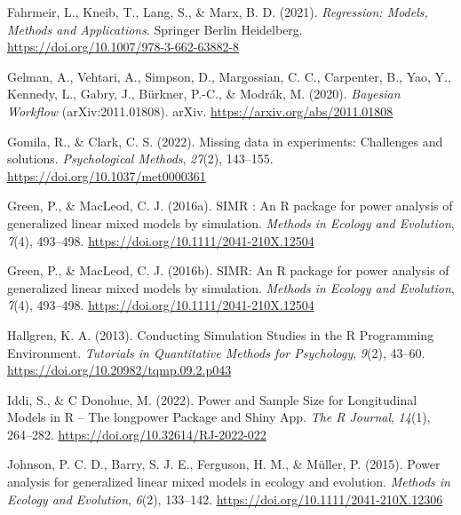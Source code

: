 \documentclass[
  man,
  floatsintext,
  longtable,
  a4paper,
  nolmodern,
  notxfonts,
  notimes,
  colorlinks=true,linkcolor=blue,citecolor=blue,urlcolor=blue]{apa7}
\newlength{\cslhangindent}
\newenvironment{CSLReferences}[2] %
 {\begin{list}{}{%
  \setlength{\itemindent}{0pt}
  \setlength{\leftmargin}{0pt}
  \setlength{\parsep}{0pt}
  \ifodd #1
   \setlength{\leftmargin}{\cslhangindent}
   \setlength{\itemindent}{-1\cslhangindent}
  \fi
  \setlength{\itemsep}{#2\baselineskip}}}
 {\end{list}}
\begin{document}
\begin{CSLReferences}{1}{0}
Fahrmeir, L., Kneib, T., Lang, S., \& Marx, B. D. (2021).
\emph{Regression: {Models}, {Methods} and {Applications}}. Springer
Berlin Heidelberg. \url{https://doi.org/10.1007/978-3-662-63882-8}

Gelman, A., Vehtari, A., Simpson, D., Margossian, C. C., Carpenter, B.,
Yao, Y., Kennedy, L., Gabry, J., Bürkner, P.-C., \& Modrák, M. (2020).
\emph{Bayesian {Workflow}} (arXiv:2011.01808). arXiv.
\url{https://arxiv.org/abs/2011.01808}

Gomila, R., \& Clark, C. S. (2022). Missing data in experiments:
{Challenges} and solutions. \emph{Psychological Methods}, \emph{27}(2),
143--155. \url{https://doi.org/10.1037/met0000361}

Green, P., \& MacLeod, C. J. (2016a). {\textsc{SIMR}} : An {R} package
for power analysis of generalized linear mixed models by simulation.
\emph{Methods in Ecology and Evolution}, \emph{7}(4), 493--498.
\url{https://doi.org/10.1111/2041-210X.12504}

Green, P., \& MacLeod, C. J. (2016b). {SIMR}: An {R} package for power
analysis of generalized linear mixed models by simulation. \emph{Methods
in Ecology and Evolution}, \emph{7}(4), 493--498.
\url{https://doi.org/10.1111/2041-210X.12504}

Hallgren, K. A. (2013). Conducting {Simulation Studies} in the {R
Programming Environment}. \emph{Tutorials in Quantitative Methods for
Psychology}, \emph{9}(2), 43--60.
\url{https://doi.org/10.20982/tqmp.09.2.p043}

Iddi, S., \& C Donohue, M. (2022). Power and {Sample Size} for
{Longitudinal Models} in {R} -- {The} longpower {Package} and {Shiny
App}. \emph{The R Journal}, \emph{14}(1), 264--282.
\url{https://doi.org/10.32614/RJ-2022-022}

Johnson, P. C. D., Barry, S. J. E., Ferguson, H. M., \& Müller, P.
(2015). Power analysis for generalized linear mixed models in ecology
and evolution. \emph{Methods in Ecology and Evolution}, \emph{6}(2),
133--142. \url{https://doi.org/10.1111/2041-210X.12306}


\end{CSLReferences}
\end{document}
